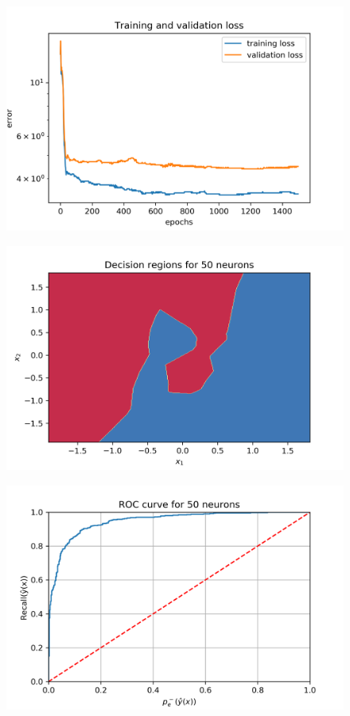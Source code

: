 \documentclass[a4paper]{article}    %
\begin{document}
\begin{figure}[H]
    \centering
    \includegraphics[width=12cm]{training_validation_loss}
    \caption{}
    \label{fig:mlp-training_validation_loss}
\end{figure}

\begin{figure}[H]
    \centering
    \includegraphics[width=12cm]{mlp_decision_region}
    \caption{}
    \label{fig:mlp-decision_regions}
\end{figure}

\begin{figure}[H]
    \centering
    \includegraphics[width=12cm]{ROC_curve}
    \caption{}
    \label{fig:mlp-roc_curve}
\end{figure}
\end{document}
